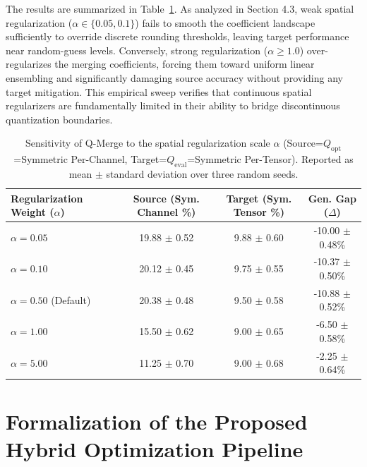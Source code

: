 \documentclass{article}
\theoremstyle{plain}
\theoremstyle{definition}
\theoremstyle{remark}
\begin{document}
The results are summarized in Table~\ref{tab:alpha_sensitivity}. As analyzed in Section 4.3, weak spatial regularization ($\alpha \in \{0.05, 0.1\}$) fails to smooth the coefficient landscape sufficiently to override discrete rounding thresholds, leaving target performance near random-guess levels. Conversely, strong regularization ($\alpha \ge 1.0$) over-regularizes the merging coefficients, forcing them toward uniform linear ensembling and significantly damaging source accuracy without providing any target mitigation. This empirical sweep verifies that continuous spatial regularizers are fundamentally limited in their ability to bridge discontinuous quantization boundaries.
\begin{table}[htbp]
\caption{Sensitivity of Q-Merge to the spatial regularization scale $\alpha$ (Source=$Q_{\text{opt}}$=Symmetric Per-Channel, Target=$Q_{\text{eval}}$=Symmetric Per-Tensor). Reported as mean $\pm$ standard deviation over three random seeds.}
\label{tab:alpha_sensitivity}
\vskip 0.15in
\begin{center}
\begin{small}
\begin{sc}
\begin{tabular}{lccc}
\toprule
Regularization Weight ($\alpha$) & Source (Sym. Channel \%) & Target (Sym. Tensor \%) & \textbf{Gen. Gap ($\Delta$)} \\
\midrule
$\alpha = 0.05$ & 19.88 $\pm$ 0.52 & 9.88 $\pm$ 0.60 & -10.00 $\pm$ 0.48\% \\
$\alpha = 0.10$ & 20.12 $\pm$ 0.45 & 9.75 $\pm$ 0.55 & -10.37 $\pm$ 0.50\% \\
$\alpha = 0.50$ (Default) & 20.38 $\pm$ 0.48 & 9.50 $\pm$ 0.58 & -10.88 $\pm$ 0.52\% \\
$\alpha = 1.00$ & 15.50 $\pm$ 0.62 & 9.00 $\pm$ 0.65 & -6.50 $\pm$ 0.58\% \\
$\alpha = 5.00$ & 11.25 $\pm$ 0.70 & 9.00 $\pm$ 0.68 & -2.25 $\pm$ 0.64\% \\
\bottomrule
\end{tabular}
\end{sc}
\end{small}
\end{center}
\vskip -0.1in
\end{table}

\newpage
\section{Formalization of the Proposed Hybrid Optimization Pipeline}
\label{appendix:hybrid_optimizer}
\end{document}
